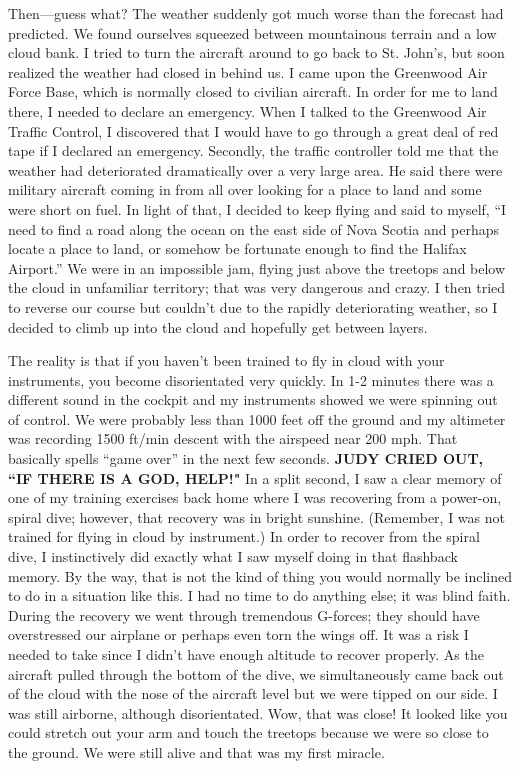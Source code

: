 \documentclass[oneside]{book}
\begin{document}
Then—guess what? The weather suddenly got much worse than the forecast had predicted. We found ourselves squeezed between mountainous terrain and a low cloud bank. I tried to turn the aircraft around to go back to St. John’s, but soon realized the weather had closed in behind us. I  came upon the Greenwood Air Force Base, which is normally closed to civilian aircraft. In order for me to land there, I needed to declare an emergency. When I talked to the Greenwood Air Traffic Control, I discovered that I would have to go through a great deal of red tape if I declared an emergency. Secondly, the traffic controller told me that the weather had deteriorated dramatically over a very large area. He said there were military aircraft coming in from all over looking for a place to land and some were short on fuel. In light of that, I decided to keep flying and said to myself, “I need to find a road along the ocean on the east side of Nova Scotia and perhaps locate a place to land, or somehow be fortunate enough to find the Halifax Airport.” We were in an impossible jam, flying just above the treetops and below the cloud in unfamiliar territory; that was very dangerous and crazy. I then tried to reverse our course but couldn’t due to the rapidly deteriorating weather, so I decided to climb up into the cloud and hopefully get between layers. 

The reality is that if you haven't been trained to fly in cloud with your instruments, you become disorientated very quickly. In 1-2 minutes there was a different sound in the cockpit and my instruments showed we were spinning out of control. We were probably less than 1000 feet off the ground and my altimeter was recording 1500 ft/min descent with the airspeed near 200 mph. That basically spells “game over” in the next few seconds. \textbf{JUDY CRIED OUT, ``IF THERE IS A GOD, HELP!"} In a split second, I saw a clear memory of one of my training exercises back home where I was recovering from a power-on, spiral dive; however, that recovery was in bright sunshine. (Remember, I was not trained for flying in cloud by instrument.) In order to recover from the spiral dive, I instinctively did exactly what I saw myself doing in that flashback memory. By the way, that is not the kind of thing you would normally be inclined to do in a situation like this. I had no time to do anything else; it was blind faith. During the recovery we went through tremendous G-forces; they should have overstressed our airplane or perhaps even torn the wings off. It was a risk I needed to take since I didn’t have enough altitude to recover properly. As the aircraft pulled through the bottom of the dive, we simultaneously came back out of the cloud with the nose of the aircraft level but we were tipped on our side. I was still airborne, although disorientated. Wow, that was close! It looked like you could stretch out your arm and touch the treetops because we were so close to the ground. We were still alive and that was my first miracle. 
\end{document}
